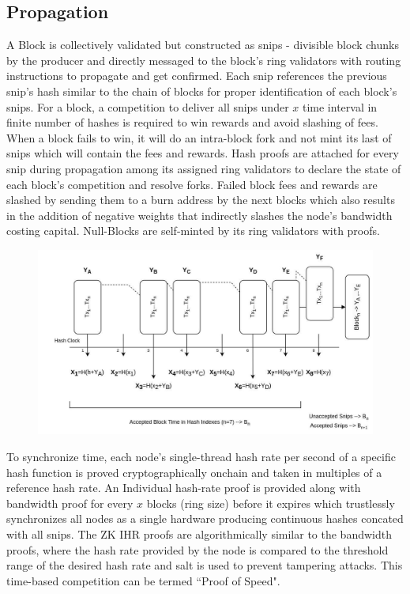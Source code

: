 \documentclass[a4paper,10pt]{article}
\begin{document}
\subsection{Propagation}
A Block is collectively validated but constructed as snips - divisible block chunks by the producer and directly messaged to the block's ring validators with routing instructions to propagate and get confirmed. Each snip references the previous snip's hash similar to the chain of blocks for proper identification of each block's snips. For a block, a competition to deliver all snips under $x$ time interval in finite number of hashes is required to win rewards and avoid slashing of fees. When a block fails to win, it will do an intra-block fork and not mint its last of snips which will contain the fees and rewards. Hash proofs are attached for every snip during propagation among its assigned ring validators to declare the state of each block's competition and resolve forks. Failed block fees and rewards are slashed by sending them to a burn address by the next blocks which also results in the addition of negative weights that indirectly slashes the node's bandwidth costing capital. Null-Blocks are self-minted by its ring validators with proofs.
\begin{figure}[h]
\begin{center}
\includegraphics[width=12cm]{Snips}
\end{center}
\end{figure}

To synchronize time, each node's single-thread hash rate per second of a specific hash function is proved cryptographically onchain and taken in multiples of a reference hash rate. An Individual hash-rate proof is provided along with bandwidth proof for every $x$ blocks (ring size) before it expires which trustlessly synchronizes all nodes as a single hardware producing continuous hashes concated with all snips. The ZK IHR proofs are algorithmically similar to the bandwidth proofs, where the hash rate provided by the node is compared to the threshold range of the desired hash rate and salt is used to prevent tampering attacks. This time-based competition can be termed ``Proof of Speed".
\end{document}
